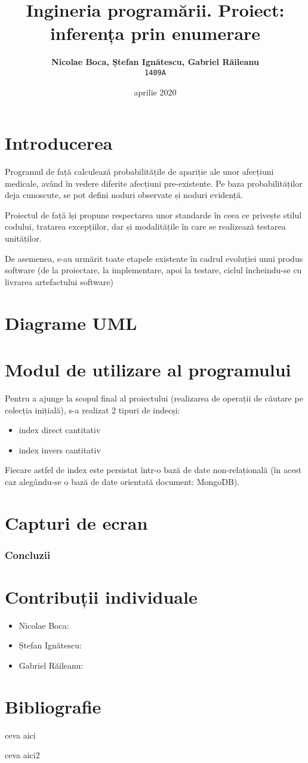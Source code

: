 \documentclass[12pt]{article}
\title{Ingineria programării. Proiect: inferența prin enumerare} %
\author{\textbf{Nicolae Boca, Ștefan Ignătescu, Gabriel Răileanu}\\ \texttt{1409A}}
\date{aprilie 2020}
\begin{document}
\maketitle %

\section{Introducerea}
Programul de față calculează probabilitățile de apariție ale unor afecțiuni medicale, având în vedere diferite afecțiuni pre-existente. Pe baza probabilităților deja cunoscute, se pot defini noduri observate și noduri evidență.
\par
Proiectul de față își propune respectarea unor standarde în ceea ce privește stilul codului, tratarea excepțiilor, dar și modalitățile în care se realizează testarea unităților.
\par
De asemenea, s-au urmărit toate etapele existente în cadrul evoluției unui produs software (de la proiectare, la implementare, apoi la testare, ciclul încheindu-se cu livrarea artefactului software)
\section{Diagrame UML}
\section{Modul de utilizare al programului}
Pentru a ajunge la scopul final al proiectului (realizarea de operații de căutare pe colecția inițială), s-a realizat 2 tipuri de indecși:
\begin{itemize}
	\item index direct cantitativ
	\item index invers cantitativ
\end{itemize}
Fiecare astfel de index este persistat într-o bază de date non-relațională (în acest caz alegându-se o bază de date orientată document: MongoDB).
\section{Capturi de ecran}
\subsubsection{Concluzii}

\section{Contribuții individuale}
\begin{itemize}
	\item Nicolae Boca:
	\item Ștefan Ignătescu:
	\item Gabriel Răileanu:
\end{itemize}
\newpage
\section{Bibliografie}
\begin{thebibliography}{9}
	ceva aici
	
	ceva aici2
\end{thebibliography}
\end{document}
